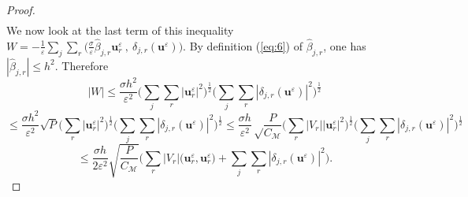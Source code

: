 \documentclass[a4paper,french,english,10pt]{article}
\newcommand\ljr{l_{jr}}
\newcommand\njr{\mathbf{n}_{jr}}
\newcommand\uu{\mathbf{u}}
\newcommand\eps{\varepsilon}
\newcommand\xj{\mathbf{x}_j}
\newcommand\xr{\mathbf{x}_r}
\begin{document}
\begin{proof}
\begin{equation*}
\begin{aligned}
\end{aligned}
\end{equation*}
We now look at the last term of this inequality $W=-\frac{1}{\eps} \sum_j \sum_r \bigg( \frac{\sigma}{\eps}
\widehat{\beta}_{j,r}\textbf{u}_r^{\eps}\: , \: \delta_{j,r}(\uu^{\eps} )\bigg)$.
By definition (\ref{eq:6}) of $\widehat{\beta}_{j,r}$, one has $\left|   \widehat{\beta}_{j,r} \right|\leq h^2$. Therefore
$$
\vert W \vert \leq \frac{\sigma h^2}{\eps^2} \bigg(\sum_j \sum_r
 \bigg| 
\textbf{u}_r^{\eps}
 \bigg|^2 \bigg)^{\frac12 } \bigg( \sum_j   \sum_r
   | \delta_{j,r}(\uu^{\eps})| ^2 \bigg)^{\frac12 } 
   $$
   $$
\leq  \frac{\sigma  h^2}{\eps^2} \sqrt P \bigg( \sum_r
 \bigg| 
\textbf{u}_r^{\eps}
 \bigg|^2 \bigg)^{\frac12 } \bigg(\sum_j \sum_r
   | \delta_{j,r}(\uu^{\eps})| ^2 \bigg)^{\frac12 } 
\leq  \frac{\sigma  h}{\eps^2} \sqrt \frac P{C_\mathcal M} \bigg( \sum_r
|V_r |
 \bigg| 
\textbf{u}_r^{\eps}
 \bigg|^2 \bigg)^{\frac12 } \bigg(\sum_j \sum_r
   | \delta_{j,r}(\uu^{\eps})| ^2 \bigg)^{\frac12 } 
   $$
   $$
   \leq
    \frac{\sigma h  }{2\eps^2}\sqrt{\frac{P}{C_\mathcal M}}
\bigg( \sum_r |V_r| \big( \textbf{u}_r^{\eps},\textbf{u}_r^{\eps}\big)  + \sum_j \sum_r    | \delta_{j,r}(\uu^{\eps})|^2 \bigg).
$$

\end{proof}
\end{document}
